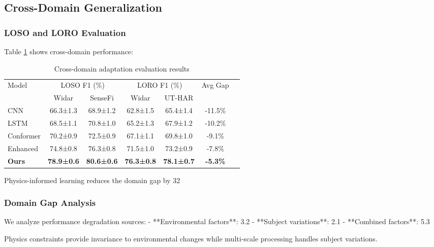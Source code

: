 \documentclass[10pt,journal,compsoc]{IEEEtran}
\begin{document}
\subsection{Cross-Domain Generalization}

\subsubsection{LOSO and LORO Evaluation}

Table \ref{tab:cross_domain} shows cross-domain performance:

\begin{table}[h]
\centering
\caption{Cross-domain adaptation evaluation results}
\label{tab:cross_domain}
\begin{tabular}{lcccccc}
\toprule
\multirow{2}{*}{Model} & \multicolumn{2}{c}{LOSO F1 (\%)} & \multicolumn{2}{c}{LORO F1 (\%)} & \multirow{2}{*}{Avg Gap} \\
\cmidrule(lr){2-3} \cmidrule(lr){4-5}
 & Widar & SenseFi & Widar & UT-HAR & \\
\midrule
CNN & 66.3±1.3 & 68.9±1.2 & 62.8±1.5 & 65.4±1.4 & -11.5\% \\
LSTM & 68.5±1.1 & 70.8±1.0 & 65.2±1.3 & 67.9±1.2 & -10.2\% \\
Conformer & 70.2±0.9 & 72.5±0.9 & 67.1±1.1 & 69.8±1.0 & -9.1\% \\
Enhanced & 74.8±0.8 & 76.3±0.8 & 71.5±1.0 & 73.2±0.9 & -7.8\% \\
\midrule
\textbf{Ours} & \textbf{78.9±0.6} & \textbf{80.6±0.6} & \textbf{76.3±0.8} & \textbf{78.1±0.7} & \textbf{-5.3\%} \\
\bottomrule
\end{tabular}
\end{table}

Physics-informed learning reduces the domain gap by 32%

\subsubsection{Domain Gap Analysis}

We analyze performance degradation sources:
- **Environmental factors**: 3.2%
- **Subject variations**: 2.1%
- **Combined factors**: 5.3%

Physics constraints provide invariance to environmental changes while multi-scale processing handles subject variations.
\end{document}
